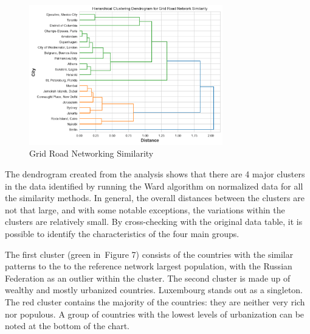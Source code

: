 \begin{figure}[htp]
\centering
\includegraphics[width=0.75\textwidth,center]{picture/Grid/grid_dendrogram2.png}
\caption[Miniaturtrichter]{Grid Road Networking Similarity}
\label{fig:network ranking}
\end{figure}

The dendrogram created from the analysis shows that there are 4 major clusters in the data identified by running the Ward algorithm on normalized data for all the similarity methods. In general, the overall distances between the clusters are not that large, and with some notable exceptions, the variations within the clusters are relatively small. By cross-checking with the original data table, it is possible to identify the characteristics of the four main groups. 

The first cluster (green in Figure 7) consists of the countries with the similar patterns to the to the reference network largest population, with the Russian Federation as an outlier within the cluster.
The second cluster is made up of wealthy and mostly urbanized countries. Luxembourg stands out as a singleton.
The red cluster contains the majority of the countries: they are neither very rich nor populous. A group of countries with the lowest levels of urbanization can be noted at the bottom of the chart.

